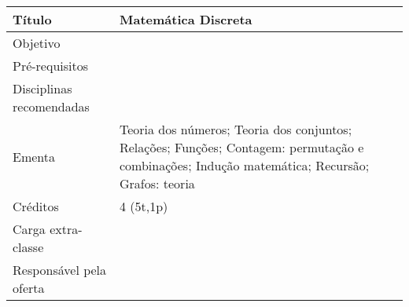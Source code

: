 \begin{tabular}{|p{4.5cm}|p{10.0cm}|} \hline

Título & Matemática Discreta \\ \hline

Objetivo &   \\ \hline

Pré-requisitos &  \\ \hline

Disciplinas recomendadas & \\ \hline

Ementa & Teoria dos números; Teoria dos conjuntos; Relações; Funções; Contagem: permutação e combinações; Indução matemática; Recursão; Grafos: teoria \\ \hline

Créditos & 4 (5t,1p) \\ \hline
Carga extra-classe &  \\ \hline
Responsável pela oferta &  \\ \hline
\end{tabular}
\\
\\

